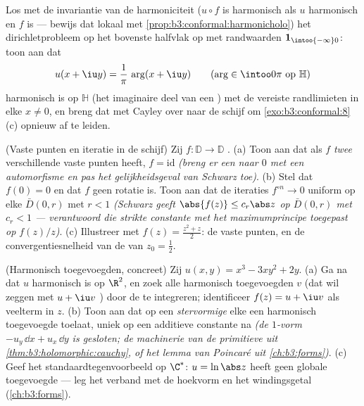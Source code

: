 \begin{exercise}[$\star\star$]\label{exo:b3:conformal:10}
Los met de  invariantie van de harmoniciteit ($u\circ f$
is harmonisch als $u$ harmonisch en $f$  is --- bewijs
dat lokaal met \cref{prop:b3:conformal:harmonicholo}) het
dirichletprobleem op het bovenste halfvlak op met randwaarden
$\mathbf 1_{\intoo{-\infty}0}$: toon aan dat
\[
u(x + \iu y) = \frac1\pi\,\arg(x + \iu y)
\qquad (\arg \in \intoo0\pi \text{ op } \mathbb H)
\]
harmonisch is op $\mathbb H$ (het imaginaire deel van een
) met de vereiste randlimieten in elke $x \neq
0$, en breng dat met Cayley over naar de schijf om
\cref{exo:b3:conformal:8}(c) opnieuw af te leiden.
\end{exercise}

\begin{exercise}[$\star\star$]\label{exo:b3:conformal:11}
(Vaste punten en iteratie in de schijf) Zij $f\colon\mathbb D \to
\mathbb D$ .
(a) Toon aan dat als $f$ \emph{twee} verschillende vaste punten
heeft, $f = \mathrm{id}$ \emph{(breng er een naar $0$ met een
automorfisme en pas het gelijkheidsgeval van Schwarz toe)}.
(b) Stel dat $f(0) = 0$ en dat $f$ geen rotatie is. Toon aan dat
de iteraties $f^{\circ n} \to 0$ uniform op elke  $\bar
D(0, r)$ met $r < 1$ \emph{(Schwarz geeft $\abs{f(z)} \leq
c_r\abs z$ op $\bar D(0,r)$ met $c_r < 1$ --- verantwoord die
strikte constante met het maximumprincipe toegepast op
$f(z)/z$)}.
(c) Illustreer met $f(z) = \frac{z^2 + z}2$: de vaste punten, en
de convergentiesnelheid van de  van $z_0 = \frac12$.
\end{exercise}

\begin{exercise}[$\star\star$]\label{exo:b3:conformal:12}
(Harmonisch toegevoegden, concreet) Zij $u(x, y) = x^3 - 3xy^2 +
2y$.
(a) Ga na dat $u$ harmonisch is op $\R^2$, en zoek alle
harmonisch toegevoegden $v$ (dat wil zeggen met $u + \iu v$
) door de  te
integreren; identificeer $f(z) = u + \iu v$ als veelterm in $z$.
(b) Toon aan dat op een \emph{stervormige}  elke
 een harmonisch toegevoegde toelaat, uniek op
een additieve constante na \emph{(de $1$-vorm $-u_y\,\dd x +
u_x\,\dd y$ is gesloten; de machinerie van de primitieve uit
\cref{thm:b3:holomorphic:cauchy}, of het lemma van Poincaré uit
\cref{ch:b3:forms})}.
(c) Geef het standaardtegenvoorbeeld op $\C^*$: $u = \ln\abs z$
heeft geen globale toegevoegde --- leg het verband met de
hoekvorm en het windingsgetal (\cref{ch:b3:forms}).
\end{exercise}

